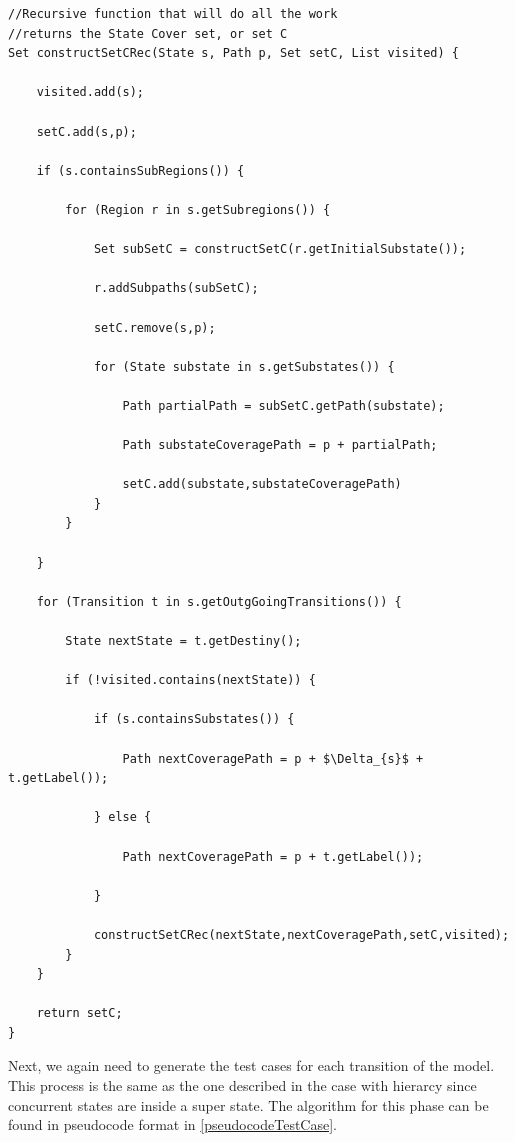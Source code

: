 \begin{lstlisting}[mathescape]
//Recursive function that will do all the work
//returns the State Cover set, or set C
Set constructSetCRec(State s, Path p, Set setC, List visited) {

	visited.add(s);

	setC.add(s,p);

	if (s.containsSubRegions()) {

		for (Region r in s.getSubregions()) {
			
			Set subSetC = constructSetC(r.getInitialSubstate());	

			r.addSubpaths(subSetC);

			setC.remove(s,p);

			for (State substate in s.getSubstates()) {
	
				Path partialPath = subSetC.getPath(substate);
	
				Path substateCoveragePath = p + partialPath;
	
				setC.add(substate,substateCoveragePath)	
			}
		}	
		
	}
	
	for (Transition t in s.getOutgGoingTransitions()) {
		
		State nextState = t.getDestiny();

		if (!visited.contains(nextState)) {

			if (s.containsSubstates()) {
			
				Path nextCoveragePath = p + $\Delta_{s}$ + t.getLabel());

			} else {

				Path nextCoveragePath = p + t.getLabel());

			}	

			constructSetCRec(nextState,nextCoveragePath,setC,visited);	
		}
	}
	
	return setC;
}
\end{lstlisting}

Next, we again need to generate the test cases for each transition of the model. This process is the same as the one described in the case with hierarcy since concurrent states are inside a super state. The algorithm for this phase can be found in pseudocode format in \ref{pseudocodeTestCase}.

